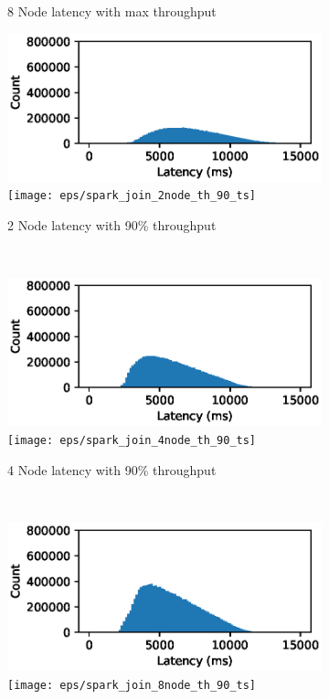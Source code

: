 \begin{figure}
\begin{subfigure}[b]{0.3\textwidth}
       \caption{8 Node latency with max throughput }
   \end{subfigure}




   \begin{subfigure}[b]{0.3\textwidth}
       \includegraphics[width=\textwidth]{eps/spark_join_2node_th_90_hist}
        \texttt{[image: eps/spark\_join\_2node\_th\_90\_ts]}

       \caption{2 Node latency with 90\% throughput }
   \end{subfigure}
   ~ 
   \begin{subfigure}[b]{0.3\textwidth}
       \includegraphics[width=\textwidth]{eps/spark_join_4node_th_90_hist}
        \texttt{[image: eps/spark\_join\_4node\_th\_90\_ts]}

       \caption{4 Node latency with 90\% throughput }
   \end{subfigure}
   ~ 
   \begin{subfigure}[b]{0.3\textwidth}
       \includegraphics[width=\textwidth]{eps/spark_join_8node_th_90_hist}
        \texttt{[image: eps/spark\_join\_8node\_th\_90\_ts]}


\end{subfigure}
\end{figure}
